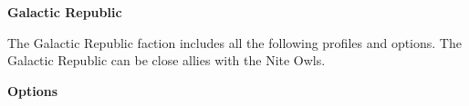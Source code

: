 \documentclass{article}
\begin{document}
{\Huge \textbf{Galactic Republic}}
\vspace{0.6cm}

\begin{minipage}{19cm}
    The Galactic Republic faction includes all the following profiles and options.
    The Galactic Republic can be close allies with the Nite Owls.
\end{minipage}

\vspace{0.3cm}
{\scriptsize

\setlength\extrarowheight{1.5pt}


}
\vspace{0.6cm}

{\Large \textbf{Options}}
\begin{multicols}{2}

{\scriptsize

\setlength\extrarowheight{1.5pt}


\vspace{0.6cm}

\setlength\extrarowheight{1.5pt}


\vspace{0.6cm}

\setlength\extrarowheight{1.5pt}


\vspace{0.6cm}

\setlength\extrarowheight{1.5pt}


\vspace{0.6cm}

\setlength\extrarowheight{1.5pt}


\vspace{0.6cm}

\setlength\extrarowheight{1.5pt}


\vspace{0.6cm}

\setlength\extrarowheight{1.5pt}


\vspace{0.6cm}

\setlength\extrarowheight{1.5pt}


}
\end{multicols}
\end{document}
